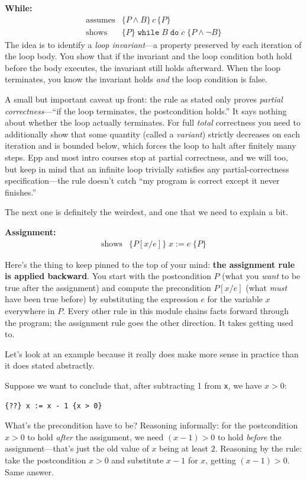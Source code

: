 \documentclass[11pt]{article}
\begin{document}
\noindent\textbf{While:}
\[
  \begin{array}{rl}
    \text{assumes} & \{P \wedge B\}\, c\, \{P\} \\
    \hline
    \text{shows} & \{P\}\; \texttt{while}\; B\; \texttt{do}\; c\; \{P \wedge \lnot B\}
  \end{array}
\]
The idea is to identify a \emph{loop invariant}---a property preserved by each iteration of the loop body. You show that if the invariant and the loop condition both hold before the body executes, the invariant still holds afterward. When the loop terminates, you know the invariant holds \emph{and} the loop condition is false.

A small but important caveat up front: the rule as stated only proves \emph{partial correctness}---``if the loop terminates, the postcondition holds.'' It says nothing about whether the loop actually terminates. For full \emph{total} correctness you need to additionally show that some quantity (called a \emph{variant}) strictly decreases on each iteration and is bounded below, which forces the loop to halt after finitely many steps. Epp and most intro courses stop at partial correctness, and we will too, but keep in mind that an infinite loop trivially satisfies any partial-correctness specification---the rule doesn't catch ``my program is correct except it never finishes.''

The next one is definitely the weirdest, and one that we need to explain a bit.

\noindent\textbf{Assignment:}
\[
  \begin{array}{rl}
    \hline
    \text{shows} & \{P[x/e]\}\; x := e\; \{P\}
  \end{array}
\]

Here's the thing to keep pinned to the top of your mind: \textbf{the assignment rule is applied backward}. You start with the postcondition $P$ (what you \emph{want} to be true after the assignment) and compute the precondition $P[x/e]$ (what \emph{must} have been true before) by substituting the expression $e$ for the variable $x$ everywhere in $P$. Every other rule in this module chains facts forward through the program; the assignment rule goes the other direction. It takes getting used to.

Let's look at an example because it really does make more sense in practice than it does stated abstractly.

Suppose we want to conclude that, after subtracting 1 from \texttt{x}, we have $x > 0$:
\begin{lstlisting}
{??} x := x - 1 {x > 0}
\end{lstlisting}
What's the precondition have to be? Reasoning informally: for the postcondition $x > 0$ to hold \emph{after} the assignment, we need $(x - 1) > 0$ to hold \emph{before} the assignment---that's just the old value of $x$ being at least $2$. Reasoning by the rule: take the postcondition $x > 0$ and substitute $x - 1$ for $x$, getting $(x - 1) > 0$. Same answer.
\end{document}
